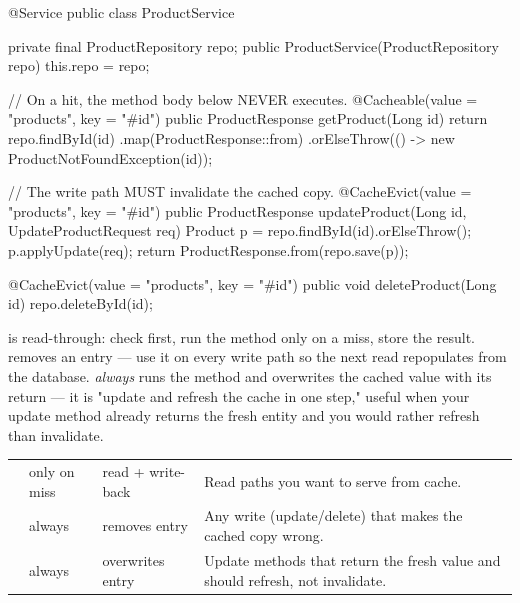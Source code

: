 \begin{javabox}
@Service
public class ProductService {
  private final ProductRepository repo;
  public ProductService(ProductRepository repo) { this.repo = repo; }

  // On a hit, the method body below NEVER executes.
  @Cacheable(value = "products", key = "#id")
  public ProductResponse getProduct(Long id) {
    return repo.findById(id)
        .map(ProductResponse::from)
        .orElseThrow(() -> new ProductNotFoundException(id));
  }

  // The write path MUST invalidate the cached copy.
  @CacheEvict(value = "products", key = "#id")
  public ProductResponse updateProduct(Long id, UpdateProductRequest req) {
    Product p = repo.findById(id).orElseThrow();
    p.applyUpdate(req);
    return ProductResponse.from(repo.save(p));
  }

  @CacheEvict(value = "products", key = "#id")
  public void deleteProduct(Long id) {
    repo.deleteById(id);
  }
}
\end{javabox}

  is read-through: check first, run the method only on a miss, store the result.  removes an entry --- use it on every write path so the next read repopulates from the database.  \emph{always} runs the method and overwrites the cached value with its return --- it is "update and refresh the cache in one step," useful when your update method already returns the fresh entity and you would rather refresh than invalidate.

\begin{center}\small
\begin{tabularx}{\linewidth}{@{}L{26mm} C{20mm} C{22mm} X@{}}
 &  &  & \\\midrule
{} & only on miss & read + write-back & Read paths you want to serve from cache.\\
 & always & removes entry & Any write (update/delete) that makes the cached copy wrong.\\
 & always & overwrites entry & Update methods that return the fresh value and should refresh, not invalidate.\\
\end{tabularx}\end{center}

